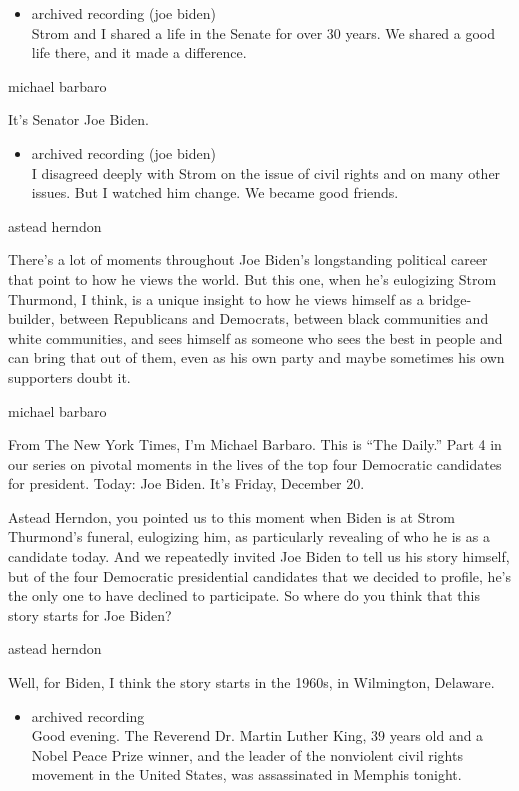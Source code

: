 \begin{itemize}
\tightlist
\item
  archived recording (joe biden)\\
  Strom and I shared a life in the Senate for over 30 years. We shared a
  good life there, and it made a difference.
\end{itemize}

michael barbaro

It's Senator Joe Biden.

\begin{itemize}
\tightlist
\item
  archived recording (joe biden)\\
  I disagreed deeply with Strom on the issue of civil rights and on many
  other issues. But I watched him change. We became good friends.
\end{itemize}

astead herndon

There's a lot of moments throughout Joe Biden's longstanding political
career that point to how he views the world. But this one, when he's
eulogizing Strom Thurmond, I think, is a unique insight to how he views
himself as a bridge-builder, between Republicans and Democrats, between
black communities and white communities, and sees himself as someone who
sees the best in people and can bring that out of them, even as his own
party and maybe sometimes his own supporters doubt it.

michael barbaro

From The New York Times, I'm Michael Barbaro. This is ``The Daily.''
Part 4 in our series on pivotal moments in the lives of the top four
Democratic candidates for president. Today: Joe Biden. It's Friday,
December 20.

Astead Herndon, you pointed us to this moment when Biden is at Strom
Thurmond's funeral, eulogizing him, as particularly revealing of who he
is as a candidate today. And we repeatedly invited Joe Biden to tell us
his story himself, but of the four Democratic presidential candidates
that we decided to profile, he's the only one to have declined to
participate. So where do you think that this story starts for Joe Biden?

astead herndon

Well, for Biden, I think the story starts in the 1960s, in Wilmington,
Delaware.

\begin{itemize}
\tightlist
\item
  archived recording\\
  Good evening. The Reverend Dr. Martin Luther King, 39 years old and a
  Nobel Peace Prize winner, and the leader of the nonviolent civil
  rights movement in the United States, was assassinated in Memphis
  tonight.
\end{itemize}


